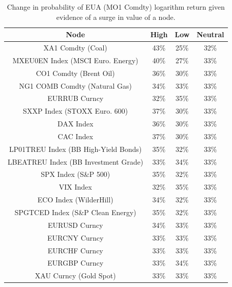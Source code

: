 \documentclass[12pt, letterpaper]{article}
\begin{document}
\begin{table}[ht]
\centering
\small
\begin{tabular}{|c|c|c|c|}
\hline
\textbf{Node} & \textbf{High} & \textbf{Low} & \textbf{Neutral} \\
\hline
XA1 Comdty (Coal) & 43\% & 25\% & 32\% \\
MXEU0EN Index (MSCI Euro. Energy) & 40\% & 27\% & 33\% \\ 
CO1 Comdty (Brent Oil) & 36\% & 30\% & 33\% \\
NG1 COMB Comdty (Natural Gas) & 34\% & 33\% & 33\% \\
EURRUB Curncy & 32\% & 35\% & 33\% \\
SXXP Index (STOXX Euro. 600) & 37\% & 30\% & 33\% \\
DAX Index & 36\% & 30\% & 33\% \\
CAC Index & 37\% & 30\% & 33\% \\ 
LP01TREU Index (BB High-Yield Bonds) & 35\% & 32\% & 33\% \\
LBEATREU Index (BB Investment Grade) & 33\% & 34\% & 33\% \\
SPX Index (S\&P 500) & 35\% & 32\% & 33\% \\
VIX Index & 32\% & 35\% & 33\% \\
ECO Index (WilderHill) & 34\% & 32\% & 33\% \\
SPGTCED Index (S\&P Clean Energy) & 35\% & 32\% & 33\% \\
EURUSD Curncy & 34\% & 33\% & 33\% \\
EURCNY Curncy & 33\% & 33\% & 33\% \\
EURCHF Curncy & 33\% & 33\% & 33\% \\ 
EURGBP Curncy & 33\% & 34\% & 33\% \\
XAU Curncy (Gold Spot) & 33\% & 33\% & 33\% \\
\hline
\end{tabular}
\caption{Change in probability of EUA (MO1 Comdty) logarithm return given evidence of a surge in value of a node.}
\label{tab:evidhigh}
\end{table}
\end{document}
